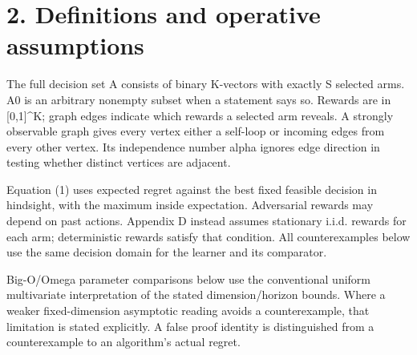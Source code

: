 \documentclass[10pt]{article}
\begin{document}
\section*{2. Definitions and operative assumptions}
The full decision set A consists of binary K-vectors with exactly S selected arms. A0 is an arbitrary nonempty subset when a statement says so. Rewards are in [0,1]\textasciicircum{}K; graph edges indicate which rewards a selected arm reveals. A strongly observable graph gives every vertex either a self-loop or incoming edges from every other vertex. Its independence number alpha ignores edge direction in testing whether distinct vertices are adjacent.\par
Equation (1) uses expected regret against the best fixed feasible decision in hindsight, with the maximum inside expectation. Adversarial rewards may depend on past actions. Appendix D instead assumes stationary i.i.d. rewards for each arm; deterministic rewards satisfy that condition. All counterexamples below use the same decision domain for the learner and its comparator.\par
Big-O/Omega parameter comparisons below use the conventional uniform multivariate interpretation of the stated dimension/horizon bounds. Where a weaker fixed-dimension asymptotic reading avoids a counterexample, that limitation is stated explicitly. A false proof identity is distinguished from a counterexample to an algorithm’s actual regret.\par
\end{document}
